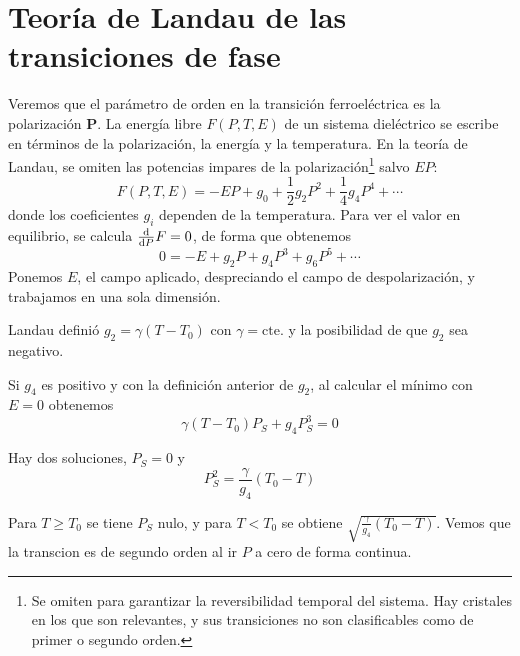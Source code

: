\documentclass{tufte-book}
\newcommand{\sub}[1]{_{{\scriptscriptstyle\mathit{#1}}}}
\begin{document}
\section{Teoría de Landau de las transiciones de fase}
Veremos que el parámetro de orden en la transición ferroeléctrica es
la polarización $\symbf{P}$.
La energía libre $F(P,T,E)$ de un sistema dieléctrico se escribe en
términos de la polarización, la energía y la temperatura. En la teoría
de Landau, se omiten las potencias impares de la
polarización\footnote{ Se omiten para garantizar la reversibilidad
  temporal del sistema. Hay cristales en los que son relevantes, y sus
  transiciones no son clasificables como de primer o segundo orden.}
salvo $EP$:
\begin{equation}
  F(P,T,E) = -EP + g_0 + \frac{1}{2} g_2 P^2 + \frac{1}{4} g_4 P^4 + ⋯
\end{equation}
donde los coeficientes $g_i$ dependen de la temperatura. Para ver el
valor en equilibrio, se calcula $\dv{}{P} F = 0$, de forma que
obtenemos
\begin{equation}
  0 = -E + g_2 P + g_4 P^3 + g_6 P^5 + ⋯
\end{equation}
Ponemos $E$, el campo aplicado, despreciando el campo de
despolarización, y trabajamos en una sola dimensión.

Landau definió $g_2 = γ(T-T_0)$ con $γ=\text{cte.}$ y la posibilidad
de que $g_2$ sea negativo.

Si $g_4$ es positivo y con la definición anterior de $g_2$, al
calcular el mínimo con $E=0$ obtenemos
\begin{equation}
  γ(T-T_0) P\sub{S} + g_4 P_S^3 = 0
\end{equation}

Hay dos soluciones, $P\sub{S}=0$ y
\begin{equation}
  P_S^2 = \frac{γ}{g_4}(T_0-T)
\end{equation}

Para $T≥T_0$ se tiene $P\sub{S}$ nulo, y para $T<T_0$ se obtiene
$\sqrt{\frac{γ}{g_4}(T_0-T)}$. Vemos que la transcion es de
segundo orden al ir $P$ a cero de forma continua.
\end{document}
